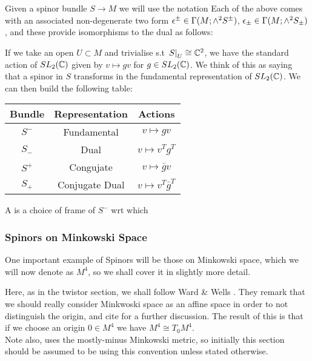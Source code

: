 \documentclass{article}
\begin{document}
\begin{notation}
	Given a spinor bundle $S \to M$ we will use the notation 
Each of the above comes with an associated non-degenerate two form $\epsilon^\pm \in \Gamma(M;\wedge^2 S^\pm)$, $ \epsilon_\pm \in \Gamma(M; \wedge^2 S_\pm)$, and these provide isomorphisms to the dual as follows:
\end{notation}
If we take an open $U \subset M$ and trivialise s.t $\left. S \right\rvert_{U} \cong \mathbb{C}^2$, we have the standard action of $SL_2(\mathbb{C})$ given by $v \mapsto gv$ for $g \in SL_2(\mathbb{C})$. We think of this as saying that a spinor in $S$ transforms in the fundamental representation of $SL_2(\mathbb{C})$. We can then build the following table:
\begin{center}
\begin{tabular}{c|c|c}
	Bundle & Representation & Actions \\ \hline \hline 
		$S^-$ & Fundamental & $v \mapsto gv$ \\ \hline 
		$S_-$ & Dual & $v \mapsto v^T g^T $ \\ \hline 
		$S^+$ & Congujate & $v \mapsto \bar{g} v$ \\ \hline 
		$S_+$ & Conjugate Dual & $v \mapsto v^T \bar{g}^T$
\end{tabular}
\end{center}
\begin{definition}
	A  is a choice of frame of $S^-$ wrt which 
\end{definition}
\subsubsection{Spinors on Minkowski Space}
One important example of Spinors will be those on Minkowski space, which we will now denote as $M^4$, so we shall cover it in slightly more detail. 
\begin{remark}
	Here, as in the twistor section, we shall follow Ward \& Wells \cite{Ward1991}. They remark that we should really consider Minkwoski space as an affine space in order to not distinguish the origin, and cite \cite{Shirokov1962} for a further discussion. The result of this is that if we choose an origin $0 \in M^4$ we have $M^4 \cong T_0 M^4$. \\
	Note also, \cite{Ward1991} uses the mostly-minus Minkowski metric, so initially this section should be assumed to be using this convention unless stated otherwise. 
\end{remark}
\end{document}
